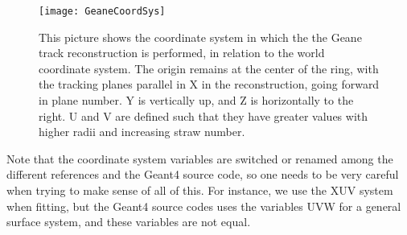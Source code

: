 	\begin{figure}[]
		\caption{This picture shows the coordinate system in which the the Geane track reconstruction is performed, in relation to the world coordinate system. The origin remains at the center of the ring, with the tracking planes parallel in X in the reconstruction, going forward in plane number. Y is vertically up, and Z is horizontally to the right. U and V are defined such that they have greater values with higher radii and increasing straw number.}
	\centering
	\texttt{[image: GeaneCoordSys]}
	\label{fig:GeaneCoordSys}
	\end{figure}

	
	Note that the coordinate system variables are switched or renamed among the different references and the Geant4 source code, so one needs to be very careful when trying to make sense of all of this. For instance, we use the XUV system when fitting, but the Geant4 source codes uses the variables UVW for a general surface system, and these variables are not equal. 
